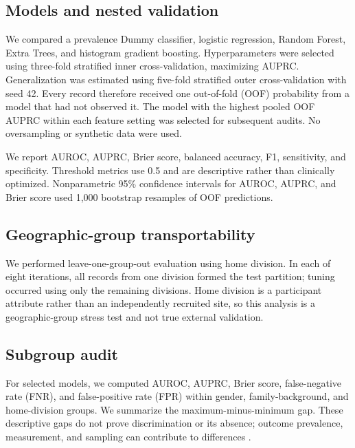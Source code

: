 \documentclass[conference]{IEEEtran}
\begin{document}
\subsection{Models and nested validation}
We compared a prevalence Dummy classifier, logistic regression, Random Forest, Extra Trees, and histogram gradient boosting. Hyperparameters were selected using three-fold stratified inner cross-validation, maximizing AUPRC. Generalization was estimated using five-fold stratified outer cross-validation with seed 42. Every record therefore received one out-of-fold (OOF) probability from a model that had not observed it. The model with the highest pooled OOF AUPRC within each feature setting was selected for subsequent audits. No oversampling or synthetic data were used.

We report AUROC, AUPRC, Brier score, balanced accuracy, F1, sensitivity, and specificity. Threshold metrics use 0.5 and are descriptive rather than clinically optimized. Nonparametric 95\% confidence intervals for AUROC, AUPRC, and Brier score used 1,000 bootstrap resamples of OOF predictions.

\subsection{Geographic-group transportability}
We performed leave-one-group-out evaluation using home division. In each of eight iterations, all records from one division formed the test partition; tuning occurred using only the remaining divisions. Home division is a participant attribute rather than an independently recruited site, so this analysis is a geographic-group stress test and not true external validation.

\subsection{Subgroup audit}
For selected models, we computed AUROC, AUPRC, Brier score, false-negative rate (FNR), and false-positive rate (FPR) within gender, family-background, and home-division groups. We summarize the maximum-minus-minimum gap. These descriptive gaps do not prove discrimination or its absence; outcome prevalence, measurement, and sampling can contribute to differences \cite{dang2024fairness}.
\end{document}
